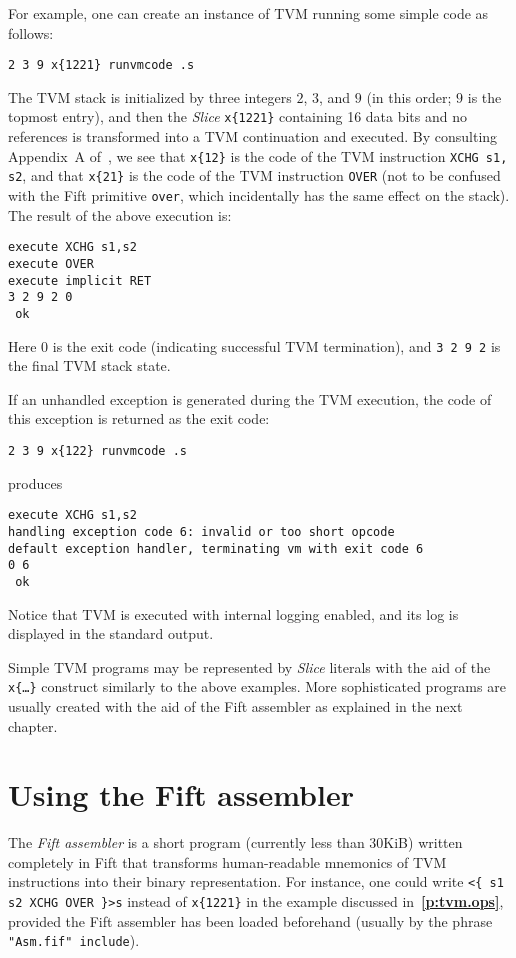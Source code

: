 \documentclass[12pt,oneside]{article}
\def\refpoint#1{{\rm\textbf{\ref{#1}}}}
\let\ptref=\refpoint
\def\mysection#1{\section{#1}\fancyhead[C]{\textsc{Chapter \textbf{\thesection.} #1}}}
\begin{document}
For example, one can create an instance of TVM running some simple code as follows:
\begin{verbatim}
2 3 9 x{1221} runvmcode .s
\end{verbatim}
The TVM stack is initialized by three integers $2$, $3$, and $9$ (in this order; $9$ is the topmost entry), and then the {\em Slice\/} {\tt x\{1221\}} containing 16 data bits and no references is transformed into a TVM continuation and executed. By consulting Appendix~A of~\cite{TVM}, we see that {\tt x\{12\}} is the code of the TVM instruction {\tt XCHG s1, s2}, and that {\tt x\{21\}} is the code of the TVM instruction {\tt OVER} (not to be confused with the Fift primitive {\tt over}, which incidentally has the same effect on the stack). The result of the above execution is:
\begin{verbatim}
execute XCHG s1,s2
execute OVER
execute implicit RET
3 2 9 2 0
 ok
\end{verbatim}
Here $0$ is the exit code (indicating successful TVM termination), and {\tt 3 2 9 2} is the final TVM stack state.

If an unhandled exception is generated during the TVM execution, the code of this exception is returned as the exit code:
\begin{verbatim}
2 3 9 x{122} runvmcode .s
\end{verbatim}
produces
\begin{verbatim}
execute XCHG s1,s2
handling exception code 6: invalid or too short opcode
default exception handler, terminating vm with exit code 6
0 6
 ok
\end{verbatim}
Notice that TVM is executed with internal logging enabled, and its log is displayed in the standard output.

Simple TVM programs may be represented by {\em Slice\/} literals with the aid of the {\tt x\{\dots\}} construct similarly to the above examples. More sophisticated programs are usually created with the aid of the Fift assembler as explained in the next chapter.

\mysection{Using the Fift assembler}
The {\em Fift assembler\/} is a short program (currently less than 30KiB) written completely in Fift that transforms human-readable mnemonics of TVM instructions into their binary representation. For instance, one could write {\tt <\{ s1 s2 XCHG OVER \}>s} instead of {\tt x\{1221\}} in the example discussed in~\ptref{p:tvm.ops}, provided the Fift assembler has been loaded beforehand (usually by the phrase {\tt "Asm.fif" include}).
\end{document}
